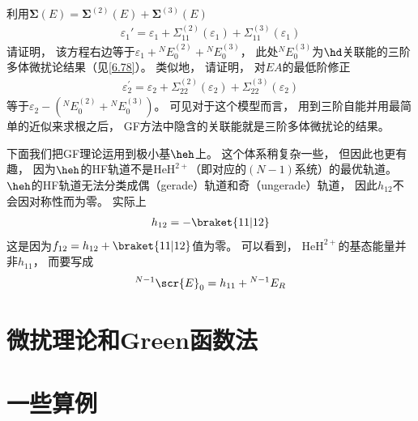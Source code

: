{利用$\mathbf{\Sigma}(E) = \mathbf{\Sigma}^{(2)}(E)+\mathbf{\Sigma}^{(3)}(E)$
    \begin{align*}
    \varepsilon_{1}'=\varepsilon_{1}+\Sigma_{11}^{(2)}\left(\varepsilon_{1}\right)+\Sigma_{11}^{(3)}\left(\varepsilon_{1}\right)
    \end{align*}
请证明，
该方程右边等于$\varepsilon_{1}+{}^{N}E_{0}^{(2)}+{}^{N} E_{0}^{(3)}$，
此处${}^{N}E_{0}^{(3)}$为$\hd$关联能的三阶多体微扰论结果（见\autoref{6.78}）。
类似地，
请证明，
对$EA$的最低阶修正
    \begin{align*}
    \varepsilon_{2}^{\prime}=\varepsilon_{2}+\Sigma_{22}^{(2)}\left(\varepsilon_{2}\right)+\Sigma_{22}^{(3)}\left(\varepsilon_{2}\right)
    \end{align*}
等于$\varepsilon_{2}-({}^{N} E_{0}^{(2)}+{}^{N} E_{0}^{(3)})$。
可见对于这个模型而言，
用到三阶自能并用最简单的近似来求根之后，
GF方法中隐含的关联能就是三阶多体微扰论的结果。

}

下面我们把GF理论运用到极小基$\heh$上。
这个体系稍复杂一些，
但因此也更有趣，
因为$\heh$的HF轨道不是$\mathrm{HeH}^{2+}$（即对应的$(N-1)$系统）的最优轨道。
$\heh$的HF轨道无法分类成偶（gerade）轨道和奇（ungerade）轨道，
因此$h_{12}$不会因对称性而为零。
实际上
\begin{align}
h_{12} = -\braket{11|12}
\end{align}
这是因为$f_{12} = h_{12} + \braket{11|12}$值为零。
可以看到，
$\mathrm{HeH}^{2+}$的基态能量并非$h_{11}$，
而要写成
\begin{align}
{}^{N-1}\scr{E}_0 = h_{11} + {}^{N-1}E_R
\end{align}
\section{微扰理论和Green函数法}
\section{一些算例}
\theendnotes
